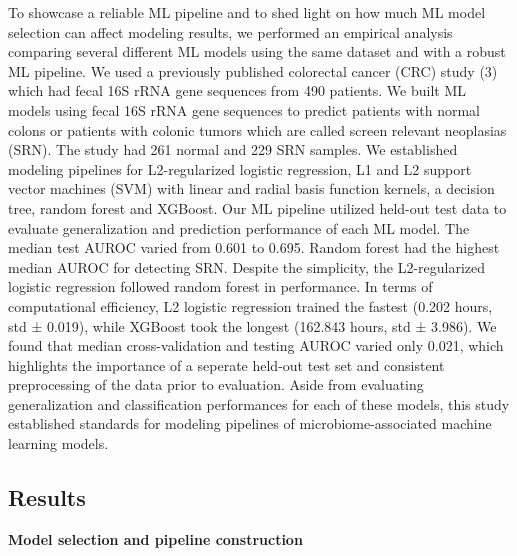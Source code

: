 \documentclass[11pt,]{article}
\begin{document}
To showcase a reliable ML pipeline and to shed light on how much ML
model selection can affect modeling results, we performed an empirical
analysis comparing several different ML models using the same dataset
and with a robust ML pipeline. We used a previously published colorectal
cancer (CRC) study (3) which had fecal 16S rRNA gene sequences from 490
patients. We built ML models using fecal 16S rRNA gene sequences to
predict patients with normal colons or patients with colonic tumors
which are called screen relevant neoplasias (SRN). The study had 261
normal and 229 SRN samples. We established modeling pipelines for
L2-regularized logistic regression, L1 and L2 support vector machines
(SVM) with linear and radial basis function kernels, a decision tree,
random forest and XGBoost. Our ML pipeline utilized held-out test data
to evaluate generalization and prediction performance of each ML model.
The median test AUROC varied from 0.601 to 0.695. Random forest had the
highest median AUROC for detecting SRN. Despite the simplicity, the
L2-regularized logistic regression followed random forest in
performance. In terms of computational efficiency, L2 logistic
regression trained the fastest (0.202 hours, std ± 0.019), while XGBoost
took the longest (162.843 hours, std ± 3.986). We found that median
cross-validation and testing AUROC varied only 0.021, which highlights
the importance of a seperate held-out test set and consistent
preprocessing of the data prior to evaluation. Aside from evaluating
generalization and classification performances for each of these models,
this study established standards for modeling pipelines of
microbiome-associated machine learning models.

\subsection{Results}\label{results}

\textbf{Model selection and pipeline construction}
\end{document}
